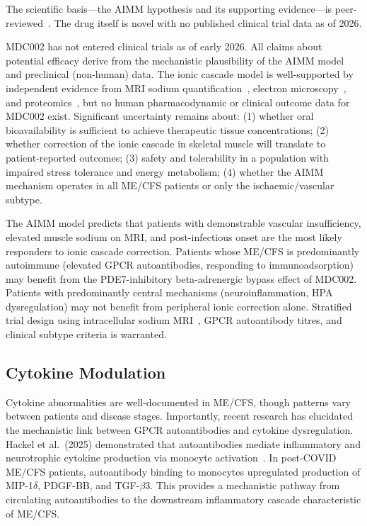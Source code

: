 The scientific basis---the AIMM hypothesis and its supporting evidence---is peer-reviewed~\cite{Scheibenbogen2025muscle,WirthScheibenbogen2021muscle,Petter2022sodium,WirthScheibenbogen2020}. The drug itself is novel with no published clinical trial data as of 2026.

\begin{limitation}
MDC002 has not entered clinical trials as of early 2026. All claims about potential efficacy derive from the mechanistic plausibility of the AIMM model and preclinical (non-human) data. The ionic cascade model is well-supported by independent evidence from MRI sodium quantification~\cite{Petter2022sodium}, electron microscopy~\cite{WirthScheibenbogen2021muscle}, and proteomics~\cite{Scheibenbogen2025muscle}, but no human pharmacodynamic or clinical outcome data for MDC002 exist. Significant uncertainty remains about: (1) whether oral bioavailability is sufficient to achieve therapeutic tissue concentrations; (2) whether correction of the ionic cascade in skeletal muscle will translate to patient-reported outcomes; (3) safety and tolerability in a population with impaired stress tolerance and energy metabolism; (4) whether the AIMM mechanism operates in all ME/CFS patients or only the ischaemic/vascular subtype.
\end{limitation}

\begin{open_question}
The AIMM model predicts that patients with demonstrable vascular insufficiency, elevated muscle sodium on MRI, and post-infectious onset are the most likely responders to ionic cascade correction. Patients whose ME/CFS is predominantly autoimmune (elevated GPCR autoantibodies, responding to immunoadsorption) may benefit from the PDE7-inhibitory beta-adrenergic bypass effect of MDC002. Patients with predominantly central mechanisms (neuroinflammation, HPA dysregulation) may not benefit from peripheral ionic correction alone. Stratified trial design using intracellular sodium MRI~\cite{Petter2022sodium}, GPCR autoantibody titres, and clinical subtype criteria is warranted.
\end{open_question}

\subsection{Cytokine Modulation}

Cytokine abnormalities are well-documented in ME/CFS, though patterns vary between patients and disease stages. Importantly, recent research has elucidated the mechanistic link between GPCR autoantibodies and cytokine dysregulation. Hackel et al.\ (2025) demonstrated that autoantibodies mediate inflammatory and neurotrophic cytokine production via monocyte activation~\cite{Hackel2025monocyte}. In post-COVID ME/CFS patients, autoantibody binding to monocytes upregulated production of MIP-1$\delta$, PDGF-BB, and TGF-$\beta$3. This provides a mechanistic pathway from circulating autoantibodies to the downstream inflammatory cascade characteristic of ME/CFS.

